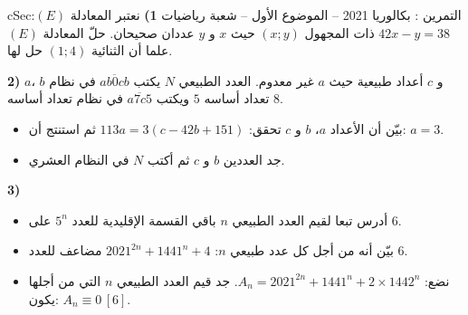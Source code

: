 \documentclass[12pt,a4paper]{article}
\newenvironment{BOX}[2]{\begin{otherlanguage}{english}\begin{arbox}{#1}{#2}}{\end{arbox}\end{otherlanguage}}
\newcounter{exo}
\newenvironment{tamrin}[1]{\stepcounter{exo}\begin{BOX}{cSec}{التمرين \theexo: #1}}{\end{BOX}}
\newenvironment{sq}{\begin{itemize}[leftmargin=2.4em,itemsep=3pt]}{\end{itemize}}
\newcommand{\qa}{\item[(أ)]}\newcommand{\qb}{\item[(ب)]}\newcommand{\qc}{\item[(جـ)]}\newcommand{\qd}{\item[(د)]}\newcommand{\qe}{\item[(هـ)]}
\begin{document}
\begin{tamrin}{بكالوريا 2021 -- الموضوع الأول -- شعبة رياضيات}
\textbf{1)} نعتبر المعادلة $(E)$:\quad $42x-y=38$ ذات المجهول $(x;y)$ حيث $x$ و $y$ عددان صحيحان.
حلّ المعادلة $(E)$ علما أن الثنائية $(1;4)$ حل لها.

\textbf{2)} $a$، $b$ و $c$ أعداد طبيعية حيث $a$ غير معدوم.
العدد الطبيعي $N$ يكتب $\overline{ab0cb}$ في نظام تعداد أساسه $5$ ويكتب $\overline{a7c5}$ في نظام تعداد أساسه $8$.
\begin{sq}
\qa بيّن أن الأعداد $a$، $b$ و $c$ تحقق: $113a=3(c-42b+151)$ ثم استنتج أن: $a=3$.
\qb جد العددين $b$ و $c$ ثم أكتب $N$ في النظام العشري.
\end{sq}
\textbf{3)}
\begin{sq}
\qa أدرس تبعا لقيم العدد الطبيعي $n$ باقي القسمة الإقليدية للعدد $5^n$ على $6$.
\qb بيّن أنه من أجل كل عدد طبيعي $n$: $2021^{2n}+1441^n+4$ مضاعف للعدد $6$.
\qc نضع: $A_n=2021^{2n}+1441^n+2\times1442^n$. جد قيم العدد الطبيعي $n$ التي من أجلها يكون: $A_n\equiv0\,[6]$.
\end{sq}
\end{tamrin}
\end{document}
